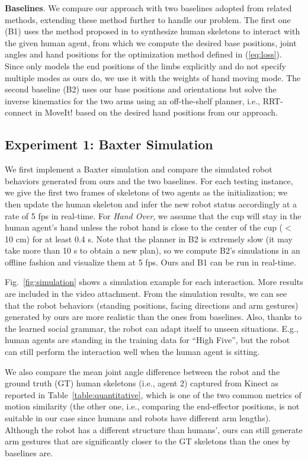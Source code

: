\documentclass[letterpaper, 10 pt, conference]{ieeeconf}  %
\begin{document}

\textbf{Baselines}. We compare our approach with two baselines adopted from related methods, extending these method further to handle our problem. The first one (B1) uses the method proposed in \cite{Shuijcai2016} to synthesize human skeletons to interact with the given human agent, from which we compute the desired base positions, joint angles and hand positions for the optimization method defined in (\ref{eq:loss}). Since \cite{Shuijcai2016} only models the end positions of the limbs explicitly and do not specify multiple modes as ours do, we use it with the weights of hand moving mode. The second baseline (B2) uses our base positions and orientations but solve the inverse kinematics for the two arms using an off-the-shelf planner, i.e., RRT-connect \cite{Kuffner2000} in MoveIt! based on the desired hand positions from our approach.

\subsection{Experiment 1: Baxter Simulation}
We first implement a Baxter simulation and compare the simulated robot behaviors generated from ours and the two baselines. For each testing instance, we give the first two frames of skeletons of two agents as the initialization; we then update the human skeleton and infer the new robot status accordingly at a rate of 5 fps in real-time. For \textit{Hand Over}, we assume that the cup will stay in the human agent's hand unless the robot hand is close to the center of the cup ($<$ 10 cm) for at least 0.4 s. Note that the planner in B2 is extremely slow (it may take more than 10 s to obtain a new plan), so we compute B2's simulations in an offline fashion and visualize them at 5 fps. Ours and B1 can be run in real-time.

Fig.~\ref{fig:simulation} shows a simulation example for each interaction. More results are included in the video attachment. From the simulation results, we can see that the robot behaviors (standing positions, facing directions and arm gestures) generated by ours are more realistic than the ones from baselines. Also, thanks to the learned social grammar, the robot can adapt itself to unseen situations. E.g., human agents are standing in the training data for ``High Five'', but the robot can still perform the interaction well when the human agent is sitting. 

We also compare the mean joint angle difference between the robot and the ground truth (GT) human skeletons (i.e., agent 2) captured from Kinect as reported in Table~{\ref{table:quantitative}}, which is one of the two common metrics of motion similarity \cite{Alibeigi2017} (the other one, i.e., comparing the end-effector positions, is not suitable in our case since humans and robots have different arm lengths). Although the robot has a different structure than humans', ours can still generate arm gestures that are significantly closer to the GT skeletons than the ones by baselines are. %
\end{document}

